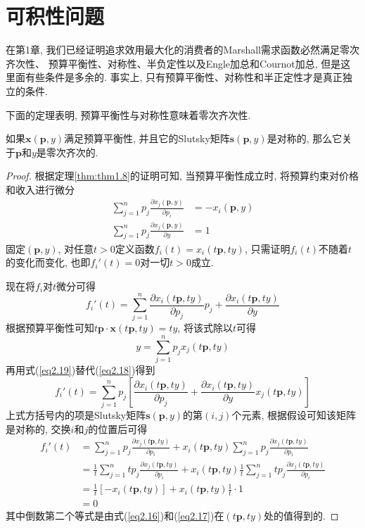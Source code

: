 \documentclass[cn, 12pt, math=mtpro2, bibstyle=apa, blue, twocol]{elegantbook}
\newcommand{\p}{\mathbf{p}}
\newcommand{\x}{\mathbf{x}}
\begin{document}
\section{可积性问题}
在第1章, 我们已经证明追求效用最大化的消费者的Marshall需求函数必然满足零次齐次性、 预算平衡性、对称性、半负定性以及Engle加总和Cournot加总, 但是这里面有些条件是多余的. 事实上, 只有预算平衡性、对称性和半正定性才是真正独立的条件.

下面的定理表明, 预算平衡性与对称性意味着零次齐次性.
\begin{theorem}
  如果$\x(\p,y)$满足预算平衡性, 并且它的Slutsky矩阵$\mathbf{s}(\p,y)$是对称的, 那么它关于$\p$和$y$是零次齐次的.
\end{theorem}
\begin{proof}
  根据定理\ref{thm:thm1.8}的证明可知, 当预算平衡性成立时, 将预算约束对价格和收入进行微分
  \begin{align}
  \sum_{j=1}^{n}p_j\frac{\partial x_j(\p,y)}{\partial p_i}&=-x_i(\p,y) \label{eq2.16} \\
  \sum_{j=1}^{n}p_j\frac{\partial x_j(\p,y)}{\partial y}&=1 \label{eq2.17}
  \end{align}
  固定$(\p,y)$, 对任意$t>0$定义函数$f_i(t)=x_i(t\p,ty)$, 只需证明$f_i(t)$不随着$t$的变化而变化, 也即$f_i'(t)=0$对一切$t>0$成立. 
  
  现在将$f_i$对$t$微分可得
  \begin{equation}\label{eq2.18}
    f_i'(t)=\sum_{j=1}^{n}\frac{\partial x_i(t\p,ty)}{\partial p_j}p_j+\frac{\partial x_i(t\p,ty)}{\partial y}
  \end{equation}
  根据预算平衡性可知$t\p\cdot\x(t\p,ty)=ty$, 将该式除以$t$可得
  \begin{equation}\label{eq2.19}
    y=\sum_{j=1}^{n}p_jx_j(t\p,ty)
  \end{equation}
  再用式(\ref{eq2.19})替代(\ref{eq2.18})得到
  $$f_i'(t)=\sum_{j=1}^{n}p_j\left[\frac{\partial x_i(t\p,ty)}{\partial p_j}+\frac{\partial x_i(t\p,ty)}{\partial y}x_j(t\p,ty)\right]$$
  上式方括号内的项是Slutsky矩阵$\mathbf{s}(\p,y)$的第$(i,j)$个元素, 根据假设可知该矩阵是对称的, 交换$i$和$j$的位置后可得
  \begin{align*}
  f_i'(t)&=\sum_{j=1}^{n}p_j\frac{\partial x_j(t\p,ty)}{\partial p_i}+x_i(t\p,ty)\sum_{j=1}^{n}p_j\frac{\partial x_j(t\p,ty)}{\partial p_i} \\
  &=\frac{1}{t}\sum_{j=1}^{n}tp_j\frac{\partial x_j(t\p,ty)}{\partial p_i}+x_i(t\p,ty)\frac{1}{t}\sum_{j=1}^{n}tp_j\frac{\partial x_j(t\p,ty)}{\partial p_i} \\
  &=\frac{1}{t}[-x_i(t\p,ty)]+x_i(t\p,ty)\frac{1}{t}\cdot1\\
  &=0
  \end{align*}
  其中倒数第二个等式是由式(\ref{eq2.16})和(\ref{eq2.17})在$(t\p,ty)$处的值得到的.
\end{proof}
\end{document}
